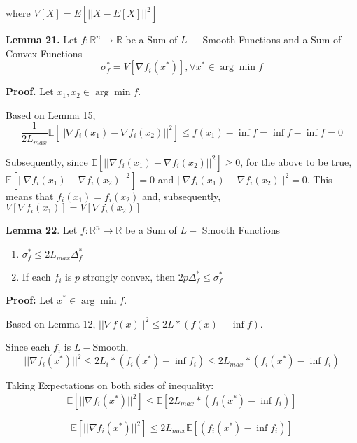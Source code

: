 where $V[X] = E[|| X - E[X] ||^2]$ \newline 


\noindent \textbf{Lemma 21.} Let $f: \mathbb{R}^n \rightarrow \mathbb{R}$ be a Sum of $L-$ Smooth Functions and a Sum of Convex Functions 
\begin{equation}
    \sigma_f^* = V[\nabla f_i(x^*)], \forall x^* \in \arg \min f
\end{equation}

\noindent \textbf{Proof.} Let $x_1, x_2 \in \arg \min f$.  

\noindent Based on Lemma 15,
\begin{equation}
    \frac{1}{2L_{max}} \mathbb{E}[||\nabla f_i(x_1) - \nabla f_i(x_2)||^2] \leq f(x_1) - \inf f = \inf f - \inf f = 0
\end{equation}

\noindent Subsequently, since $\mathbb{E}[||\nabla f_i(x_1) - \nabla f_i(x_2)||^2] \geq 0$, for the above to be true, $\mathbb{E}[||\nabla f_i(x_1) - \nabla f_i(x_2)||^2] = 0$
and $||\nabla f_i(x_1) - \nabla f_i(x_2)||^2 = 0$. This means that $f_i(x_1) = f_i(x_2)$ and, subsequently, $V[\nabla f_i(x_1)] = V[\nabla f_i(x_2)]$

\noindent \textbf{Lemma 22}. Let $f: \mathbb{R}^n \rightarrow \mathbb{R}$ be a Sum of $L-$ Smooth Functions

\begin{enumerate}
    \item $\sigma_f^* \leq 2L_{max} \Delta^*_f$
    \item If each $f_i$ is $p$ strongly convex, then $2p\Delta^*_f \leq \sigma_f^*$
\end{enumerate}

\noindent \textbf{Proof:} Let $x^* \in \arg \min f$. 

\noindent Based on Lemma 12, $||\nabla f(x)||^2 \leq 2L * (f(x) - \inf f)$. 

\noindent Since each $f_i$ is $L-$Smooth,
\begin{equation}
    ||\nabla f_i(x^*)||^2 \leq 2L_i * (f_i(x^*) - \inf f_i) \leq 2L_{max} *  (f_i(x^*) - \inf f_i)
\end{equation}

\noindent Taking Expectations on both sides of inequality:
\begin{equation}
    \mathbb{E}[||\nabla f_i(x^*)||^2] \leq \mathbb{E}[2L_{max} * (f_i(x^*) - \inf f_i)]
\end{equation}

\begin{equation}
    \mathbb{E}[||\nabla f_i(x^*)||^2] \leq 2L_{max}  \mathbb{E}[(f_i(x^*) - \inf f_i)]
\end{equation}

